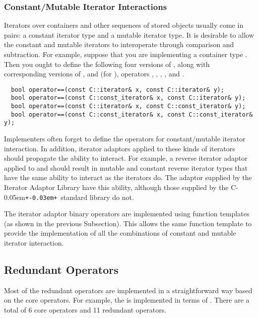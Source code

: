 \documentclass{netobjectdays}
\newcommand{\Cpp}{C\kern-0.05em\texttt{+\kern-0.03em+}}
\newcommand{\reverseiterator}{\code{reverse\_\-iterator}}
\begin{document}
\subsubsection{Constant/Mutable Iterator Interactions}
\label{sec:constant-mutable-iterations}

Iterators over containers and other sequences of stored objects
usually come in pairs: a constant iterator type and a mutable iterator
type. It is desirable to allow the constant and mutable iterators to
interoperate through comparison and subtraction. For example, suppose
that you are implementing a container type . Then you ought to
define the following four versions of , along with
corresponding versions of , and (for
), operators \code{<}, \code{>},
\code{<=}, \code{>=}, and \code{-}.

{\footnotesize
\begin{verbatim}
  bool operator==(const C::iterator& x, const C::iterator& y);
  bool operator==(const C::const_iterator& x, const C::iterator& y);
  bool operator==(const C::iterator& x, const C::const_iterator& y);
  bool operator==(const C::const_iterator& x, const C::const_iterator& y);
\end{verbatim}
}

Implementers often forget to define the operators for constant/mutable
iterator interaction. In addition, iterator adaptors applied to these
kinds of iterators should propagate the ability to interact. For
example, a reverse iterator adaptor applied to  and
 should result in mutable and constant
reverse iterator types that have the same ability to interact as the
 iterators do. The \reverseiterator{} adaptor supplied by
the Iterator Adaptor Library have this ability, although those
supplied by the \Cpp\ standard library do not.

The iterator adaptor binary operators are implemented using function
templates (as shown in the previous Subsection). This allows the same
function template to provide the implementation of all the
combinations of constant and mutable iterator interaction.


\subsection{Redundant Operators}

Most of the redundant operators are implemented in a straightforward
way based on the core operators. For example, the  is
implemented in terms of . There are a total of 6 core
operators and 11 redundant operators.
\end{document}

